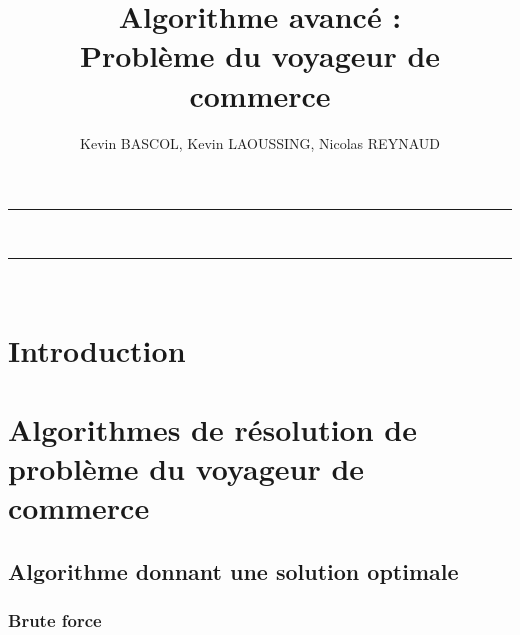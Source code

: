 \documentclass[10pt,a4paper]{report}
\author{Kevin BASCOL, Kevin LAOUSSING, Nicolas REYNAUD}
\title{Algorithme avancé : \\Problème du voyageur de commerce}
\begin{document}
\makeatletter
	\begin{titlepage}
	
	\begin{figure}
		\begin{minipage}[c]{.46\linewidth}
		\end{minipage} \hfill
		\begin{minipage}[c]{.20\linewidth}

		\end{minipage}
	\vspace{1cm}
	\end{figure}
	
	\centering
		{
		\hrule height 2pt
		\vspace{0.7cm}
		\Huge \textbf{\@title}}\\
		\vspace{0.7cm}
		\hrule height 2pt
		
		\vfill
		\vspace{1cm}
		\@author\\
		\end{titlepage}
\makeatother
\setcounter{secnumdepth}{5}
\setcounter{tocdepth}{5}
\renewcommand{\contentsname}{Sommaire}
\begingroup\makeatletter
\def\@makeschapterhead#1{%
  {\parindent \z@ \raggedright
    \normalfont
    \interlinepenalty\@M
    \Huge \bfseries  #1\par\nobreak
    \vskip 20pt%
  }}\makeatother
\tableofcontents
\endgroup
\thispagestyle{empty}
\setcounter{page}{0}
\newpage


\section{Introduction}

\section{Algorithmes de résolution de problème du voyageur de commerce}

	\subsection{Algorithme donnant une solution optimale}
		\subsubsection{Brute force}
		
\end{document}
